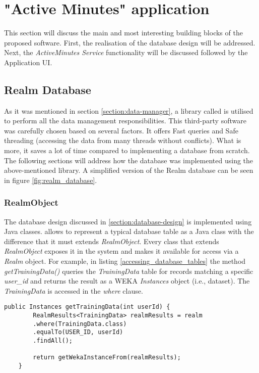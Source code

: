 \section{"Active Minutes" application} 
This section will discuss the main and most interesting building blocks of the proposed software. First, the realisation of the database design will be addressed. Next, the \textit{ActiveMinutes Service} functionality will be discussed followed by the Application UI.  
    
    \subsection{Realm Database}
    As it was mentioned in section \ref{section:data-manager}, a library called \citet{realmdatabase_2017} is utilised to perform all the data management responsibilities. This third-party software was carefully chosen based on several factors. It offers Fast queries and Safe threading (accessing the data from many threads without conflicts). What is more, it saves a lot of time compared to implementing a database from scratch. The following sections will address how the database was implemented using the above-mentioned library. A simplified version of the Realm database can be seen in figure \ref{fig:realm_database}. 
    
    \subsubsection{RealmObject}
     The database design discussed in \ref{section:database-design} is implemented using Java classes. \citet{realmdatabase_2017} allows to represent a typical database table as a Java class with the difference that it must extends \textit{RealmObject}. Every class that extends \textit{RealmObject} exposes it in the system and makes it available for access via a \textit{Realm} object. For example, in listing \ref{accessing_database_tables} the method \textit{getTrainingData()} queries the \textit{TrainingData} table for records matching a specific \textit{user\_id} and returns the result as a WEKA \textit{Instances} object (i.e., dataset). The \textit{TrainingData} is accessed in the \textit{where} clause.
     
     \begin{lstlisting}[caption= Accessing database tables, label=accessing_database_tables,frame=tlrbr,basicstyle=\small,captionpos=b]
   public Instances getTrainingData(int userId) {
        RealmResults<TrainingData> realmResults = realm
        .where(TrainingData.class)
        .equalTo(USER_ID, userId)
        .findAll();
        
        return getWekaInstanceFrom(realmResults);
    }
\end{lstlisting}
    
